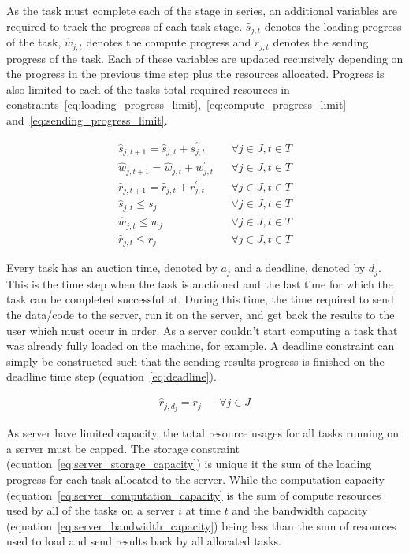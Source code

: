 As the task must complete each of the stage in series, an additional variables are required to track the progress of
each task stage. $\hat{s}_{j,t}$ denotes the loading progress of the task, $\hat{w}_{j,t}$ denotes the compute progress
and $\hat{r}_{j,t}$ denotes the sending progress of the task. Each of these variables are updated recursively depending
on the progress in the previous time step plus the resources allocated. Progress is also limited to each of the tasks
total required resources in constraints~\eqref{eq:loading_progress_limit},~\eqref{eq:compute_progress_limit}
and~\eqref{eq:sending_progress_limit}.

\begin{align}
    \hat{s}_{j,t+1} = \hat{s}_{j,t} + s^{'}_{j,t} && \forall{j \in J, t \in T } \label{eq:loading_progress} \\
    \hat{w}_{j,t+1} = \hat{w}_{j,t} + w^{'}_{j,t} && \forall{j \in J, t \in T } \label{eq:compute_progress} \\
    \hat{r}_{j,t+1} = \hat{r}_{j,t} + r^{'}_{j,t} && \forall{j \in J, t \in T } \label{eq:sending_progress} \\
    \hat{s}_{j,t} \leq s_j && \forall{j \in J, t \in T} \label{eq:loading_progress_limit} \\
    \hat{w}_{j,t} \leq w_j && \forall{j \in J, t \in T} \label{eq:compute_progress_limit} \\
    \hat{r}_{j,t} \leq r_j && \forall{j \in J, t \in T} \label{eq:sending_progress_limit}
\end{align}

Every task has an auction time, denoted by $a_j$ and a deadline, denoted by $d_j$. This is the time step when the task
is auctioned and the last time for which the task can be completed successful at. During this time, the time required
to send the data/code to the server, run it on the server, and get back the results to the user which must occur in
order. As a server couldn't start computing a task that was already fully loaded on the machine, for example. A
deadline constraint can simply be constructed such that the sending results progress is finished on the deadline
time step (equation~\eqref{eq:deadline}).

\begin{align}
    \hat{r}_{j, d_j} = r_j && \forall{j \in J} \label{eq:deadline}
\end{align}

As server have limited capacity, the total resource usages for all tasks running on a server must be capped.
The storage constraint (equation~\eqref{eq:server_storage_capacity}) is unique it the sum of the loading progress for
each task allocated to the server. While the computation capacity (equation~\eqref{eq:server_computation_capacity} is
the sum of compute resources used by all of the tasks on a server $i$ at time $t$ and the bandwidth capacity
(equation~\eqref{eq:server_bandwidth_capacity}) being less than the sum of resources used to load and send results back
by all allocated tasks.

